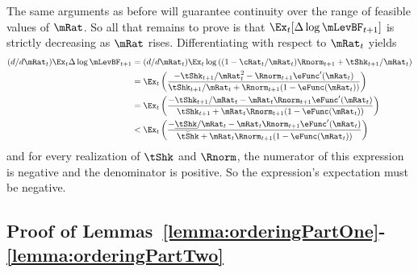 \documentclass[\econtexRoot/BufferStockTheory]{subfiles}
\begin{document}
The same arguments as before will guarantee continuity over the range of feasible values of $\mRat$.  So all that remains to prove is that $\Ex_{t} [\Delta \log \mLevBF_{t+1}]$ is strictly decreasing as $\mRat$ rises.
Differentiating with respect to $\mRat_{t}$ yields 
\begin{equation}\begin{split}
    (d/d\mRat_{t})  \Ex_{t} \Delta \log \mLevBF_{t+1} & = (d/d\mRat_{t})\Ex_{t} \log \left((1-\cRat_{t}/\mRat_{t})\Rnorm_{t+1}+\tShk_{t+1}/\mRat_{t}\right)
    \\ & = \Ex_{t} \left(\frac{-\tShk_{t+1}/\mRat^{2}_{t}-\Rnorm_{t+1}\eFunc^{\prime}(\mRat_{t})}{\tShk_{t+1}/\mRat_{t}+\Rnorm_{t+1}(1-\eFunc(\mRat_{t}))}\right)
    \\ & = \Ex_{t} \left(\frac{-\tShk_{t+1}/\mRat_{t}-\mRat_{t}\Rnorm_{t+1}\eFunc^{\prime}(\mRat_{t})}{\tShk_{t+1}+\mRat_{t}\Rnorm_{t+1}(1-\eFunc(\mRat_{t}))}\right)
    \\ & < \Ex_{t} \left(\frac{-\underline{\tShk}/\mRat_{t}-\mRat_{t}\Rnorm_{t+1}\eFunc^{\prime}(\mRat_{t})}{\bar{\tShk}+\mRat_{t}\Rnorm_{t+1}(1-\eFunc(\mRat_{t}))}\right)
  \end{split}\end{equation}
and for every realization of $\tShk$ and $\Rnorm$, the numerator of this expression is negative and the denominator is positive.  So the expression's expectation must be negative.


\subsection{Proof of Lemmas~\ref{lemma:orderingPartOne}-\ref{lemma:orderingPartTwo}}
\end{document}
